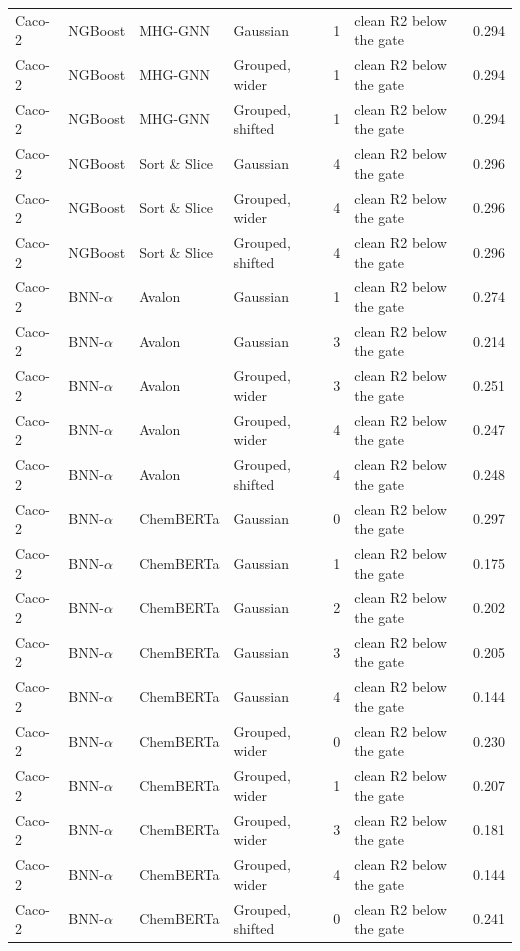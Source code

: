 {\begin{longtable}{llllcll}
Caco-2 & NGBoost & MHG-GNN & Gaussian & 1 & clean R2 below the gate & 0.294 \\
Caco-2 & NGBoost & MHG-GNN & Grouped, wider & 1 & clean R2 below the gate & 0.294 \\
Caco-2 & NGBoost & MHG-GNN & Grouped, shifted & 1 & clean R2 below the gate & 0.294 \\
Caco-2 & NGBoost & Sort \& Slice & Gaussian & 4 & clean R2 below the gate & 0.296 \\
Caco-2 & NGBoost & Sort \& Slice & Grouped, wider & 4 & clean R2 below the gate & 0.296 \\
Caco-2 & NGBoost & Sort \& Slice & Grouped, shifted & 4 & clean R2 below the gate & 0.296 \\
Caco-2 & BNN-$\alpha$ & Avalon & Gaussian & 1 & clean R2 below the gate & 0.274 \\
Caco-2 & BNN-$\alpha$ & Avalon & Gaussian & 3 & clean R2 below the gate & 0.214 \\
Caco-2 & BNN-$\alpha$ & Avalon & Grouped, wider & 3 & clean R2 below the gate & 0.251 \\
Caco-2 & BNN-$\alpha$ & Avalon & Grouped, wider & 4 & clean R2 below the gate & 0.247 \\
Caco-2 & BNN-$\alpha$ & Avalon & Grouped, shifted & 4 & clean R2 below the gate & 0.248 \\
Caco-2 & BNN-$\alpha$ & ChemBERTa & Gaussian & 0 & clean R2 below the gate & 0.297 \\
Caco-2 & BNN-$\alpha$ & ChemBERTa & Gaussian & 1 & clean R2 below the gate & 0.175 \\
Caco-2 & BNN-$\alpha$ & ChemBERTa & Gaussian & 2 & clean R2 below the gate & 0.202 \\
Caco-2 & BNN-$\alpha$ & ChemBERTa & Gaussian & 3 & clean R2 below the gate & 0.205 \\
Caco-2 & BNN-$\alpha$ & ChemBERTa & Gaussian & 4 & clean R2 below the gate & 0.144 \\
Caco-2 & BNN-$\alpha$ & ChemBERTa & Grouped, wider & 0 & clean R2 below the gate & 0.230 \\
Caco-2 & BNN-$\alpha$ & ChemBERTa & Grouped, wider & 1 & clean R2 below the gate & 0.207 \\
Caco-2 & BNN-$\alpha$ & ChemBERTa & Grouped, wider & 3 & clean R2 below the gate & 0.181 \\
Caco-2 & BNN-$\alpha$ & ChemBERTa & Grouped, wider & 4 & clean R2 below the gate & 0.144 \\
Caco-2 & BNN-$\alpha$ & ChemBERTa & Grouped, shifted & 0 & clean R2 below the gate & 0.241 \\

\end{longtable}}
